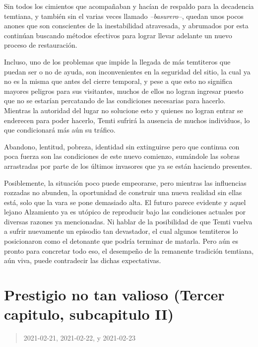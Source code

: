 \documentclass[
  spanish,
]{book}
\begin{document}
Sin todos los cimientos que acompañaban y hacían de respaldo para la decadencia temtiana, y también sin el varias veces llamado \emph{--basurero--}, quedan unos pocos anones que son conscientes de la inestabilidad atravesada, y abrumados por esta continúan buscando métodos efectivos para lograr llevar adelante un nuevo proceso de restauración.

Incluso, uno de los problemas que impide la llegada de más temtiteros que puedan ser o no de ayuda, son inconvenientes en la seguridad del sitio, la cual ya no es la misma que antes del cierre temporal, y pese a que esto no significa mayores peligros para sus visitantes, muchos de ellos no logran ingresar puesto que no se estarían percatando de las condiciones necesarias para hacerlo. Mientras la autoridad del lugar no solucione esto y quienes no logran entrar se enderecen para poder hacerlo, Temti sufrirá la ausencia de muchos individuos, lo que condicionará más aún su tráfico.

Abandono, lentitud, pobreza, identidad sin extinguirse pero que continua con poca fuerza son las condiciones de este nuevo comienzo, sumándole las sobras arrastradas por parte de los últimos invasores que ya se están haciendo presentes.

Posiblemente, la situación poco puede empeorarse, pero mientras las influencias rozzadas no abunden, la oportunidad de construir una nueva realidad sin ellas está, solo que la vara se pone demasiado alta. El futuro parece evidente y aquel lejano Alzamiento ya es utópico de reproducir bajo las condiciones actuales por diversas razones ya mencionadas. Ni hablar de la posibilidad de que Temti vuelva a sufrir nuevamente un episodio tan devastador, el cual algunos temtiteros lo posicionaron como el detonante que podría terminar de matarla. Pero aún es pronto para concretar todo eso, el desempeño de la remanente tradición temtiana, aún viva, puede contradecir las dichas expectativas.

\hypertarget{prestigio-no-tan-valioso-tercer-capitulo-subcapitulo-ii}{%
\section{Prestigio no tan valioso (Tercer capitulo, subcapitulo II)}\label{prestigio-no-tan-valioso-tercer-capitulo-subcapitulo-ii}}

\begin{quote}
2021-02-21, 2021-02-22, y 2021-02-23
\end{quote}
\end{document}
